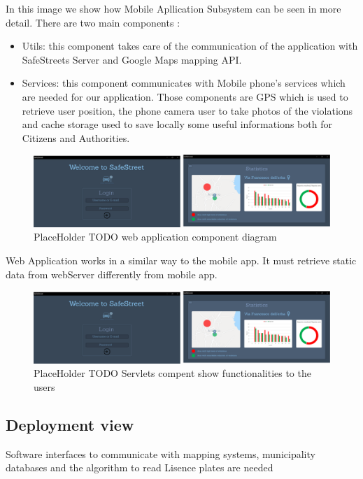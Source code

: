 In this image we show how Mobile Apllication Subsystem can be seen in more detail.
There are two main components : 
\begin{itemize}
\item Utils:  this component takes care of the communication of the application with SafeStreets Server and Google Maps mapping API.
\item Services: this component communicates with Mobile phone's services which are needed for our application. Those components are GPS which is used to retrieve user position, the phone camera user to take photos of the violations and cache storage used to save locally some useful informations both for Citizens and Authorities.
\end{itemize}
\begin{figure}[h]
\centering
\includegraphics[width=\textwidth]{Images/desktop_common_interface.png}
\caption{\label{fig:ComWI}PlaceHolder TODO web application component diagram}
\end{figure}
Web Application works in a similar way to the mobile app. It must retrieve static data from webServer differently from mobile app.
\begin{figure}[h]
\centering
\includegraphics[width=\textwidth]{Images/desktop_common_interface.png}
\caption{\label{fig:ComWI}PlaceHolder TODO Servlets compent show functionalities to the users}
\end{figure}
\subsection{Deployment view}
Software interfaces to communicate with mapping systems, municipality databases and the algorithm to read Lisence plates are needed 

